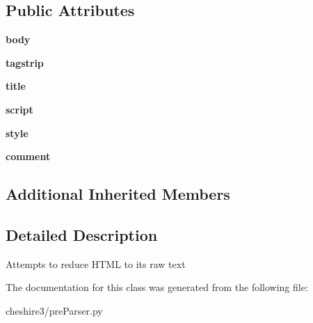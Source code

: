 \subsection*{Public Attributes}
\begin{DoxyCompactItemize}
\item 
\hypertarget{classcheshire3_1_1pre_parser_1_1_html_smash_pre_parser_a34131e30da5f8abbcb8bbef3f3db4b68}{{\bfseries body}}\label{classcheshire3_1_1pre_parser_1_1_html_smash_pre_parser_a34131e30da5f8abbcb8bbef3f3db4b68}

\item 
\hypertarget{classcheshire3_1_1pre_parser_1_1_html_smash_pre_parser_a760d2dcf15f9740ebfc83a916a3fead4}{{\bfseries tagstrip}}\label{classcheshire3_1_1pre_parser_1_1_html_smash_pre_parser_a760d2dcf15f9740ebfc83a916a3fead4}

\item 
\hypertarget{classcheshire3_1_1pre_parser_1_1_html_smash_pre_parser_a73773899721862f4e08d0cd5ed9f6b3b}{{\bfseries title}}\label{classcheshire3_1_1pre_parser_1_1_html_smash_pre_parser_a73773899721862f4e08d0cd5ed9f6b3b}

\item 
\hypertarget{classcheshire3_1_1pre_parser_1_1_html_smash_pre_parser_afbc40ac102dedc2c86a06314eca50dd3}{{\bfseries script}}\label{classcheshire3_1_1pre_parser_1_1_html_smash_pre_parser_afbc40ac102dedc2c86a06314eca50dd3}

\item 
\hypertarget{classcheshire3_1_1pre_parser_1_1_html_smash_pre_parser_a8c5c1fa29ed63bdcf78afa13437472b0}{{\bfseries style}}\label{classcheshire3_1_1pre_parser_1_1_html_smash_pre_parser_a8c5c1fa29ed63bdcf78afa13437472b0}

\item 
\hypertarget{classcheshire3_1_1pre_parser_1_1_html_smash_pre_parser_a10f9c7140aac39aad9cbdcd3cf7c7a3e}{{\bfseries comment}}\label{classcheshire3_1_1pre_parser_1_1_html_smash_pre_parser_a10f9c7140aac39aad9cbdcd3cf7c7a3e}

\end{DoxyCompactItemize}
\subsection*{Additional Inherited Members}


\subsection{Detailed Description}
\begin{DoxyVerb}Attempts to reduce HTML to its raw text \end{DoxyVerb}
 

The documentation for this class was generated from the following file\-:\begin{DoxyCompactItemize}
\item 
cheshire3/pre\-Parser.\-py\end{DoxyCompactItemize}
